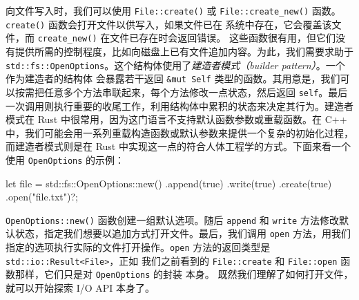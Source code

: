 向文件写入时，我们可以使用 \texttt{File::\allowbreak{}create(\allowbreak{})\allowbreak{}} 或 \texttt{File::\allowbreak{}create\_\allowbreak{}new(\allowbreak{})\allowbreak{}} 函数。
\texttt{create()} 函数会打开文件以供写入，如果文件已在
系统中存在，它会覆盖该文件，而 \texttt{create\_\allowbreak{}new(\allowbreak{})\allowbreak{}} 在文件已存在时会返回错误。
这些函数很有用，但它们没有提供所需的控制程度，比如向磁盘上已有文件追加内容。为此，我们需要求助于
\texttt{std::\allowbreak{}fs::\allowbreak{}OpenOptions}。这个结构体使用了\emph{建造者模式（builder pattern）}。一个作为建造者的结构体
\label{idx:idx_c1fbadb0}
会暴露若干返回 \texttt{\&mut Self} 类型的函数。其用意是，我们可以按需把任意多个方法串联起来，每个方法修改一点状态，然后返回 \texttt{self}。最后一次调用则执行重要的收尾工作，利用结构体中累积的状态来决定其行为。建造者模式在 Rust 中很常用，因为这门语言不支持默认函数参数或重载函数。在 C++ 中，我们可能会用一系列重载构造函数或默认参数来提供一个复杂的初始化过程，而建造者模式则是在 Rust 中实现这一点的符合人体工程学的方式。下面来看一个使用 \texttt{OpenOptions} 的示例：
\begin{codebox}[rust]
let file = std::fs::OpenOptions::new()
    .append(true)
    .write(true)
    .create(true)
    .open("file.txt")?;
\end{codebox}
\texttt{OpenOptions::\allowbreak{}new(\allowbreak{})\allowbreak{}} 函数创建一组默认选项。随后 \texttt{append} 和 \texttt{write} 方法修改默认状态，指定我们想要以追加方式打开文件。最后，我们调用 \texttt{open} 方法，用我们指定的选项执行实际的文件打开操作。\texttt{open} 方法的返回类型是 \texttt{std::\allowbreak{}io::\allowbreak{}Result<\allowbreak{}File>\allowbreak{}}，正如
我们之前看到的 \texttt{File::\allowbreak{}create} 和 \texttt{File::open} 函数那样，它们只是对 \texttt{OpenOptions} 的封装
本身。
既然我们理解了如何打开文件，就可以开始探索 I/\allowbreak{}O API 本身了。
